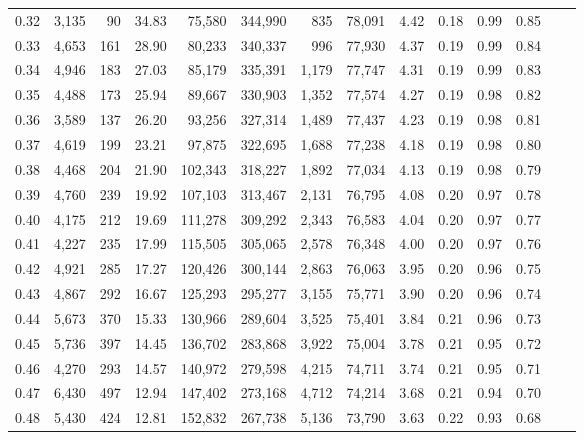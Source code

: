 \begin{tabular}{rrrrrrrrrrrrrr}
0.32 &  3,135 &     90 &    34.83 &   75,580 &  344,990 &     835 &  78,091 &  4.42 &  0.18 &  0.99 &      0.85 \\
0.33 &  4,653 &    161 &    28.90 &   80,233 &  340,337 &     996 &  77,930 &  4.37 &  0.19 &  0.99 &      0.84 \\
0.34 &  4,946 &    183 &    27.03 &   85,179 &  335,391 &   1,179 &  77,747 &  4.31 &  0.19 &  0.99 &      0.83 \\
0.35 &  4,488 &    173 &    25.94 &   89,667 &  330,903 &   1,352 &  77,574 &  4.27 &  0.19 &  0.98 &      0.82 \\
0.36 &  3,589 &    137 &    26.20 &   93,256 &  327,314 &   1,489 &  77,437 &  4.23 &  0.19 &  0.98 &      0.81 \\
0.37 &  4,619 &    199 &    23.21 &   97,875 &  322,695 &   1,688 &  77,238 &  4.18 &  0.19 &  0.98 &      0.80 \\
0.38 &  4,468 &    204 &    21.90 &  102,343 &  318,227 &   1,892 &  77,034 &  4.13 &  0.19 &  0.98 &      0.79 \\
0.39 &  4,760 &    239 &    19.92 &  107,103 &  313,467 &   2,131 &  76,795 &  4.08 &  0.20 &  0.97 &      0.78 \\
0.40 &  4,175 &    212 &    19.69 &  111,278 &  309,292 &   2,343 &  76,583 &  4.04 &  0.20 &  0.97 &      0.77 \\
0.41 &  4,227 &    235 &    17.99 &  115,505 &  305,065 &   2,578 &  76,348 &  4.00 &  0.20 &  0.97 &      0.76 \\
0.42 &  4,921 &    285 &    17.27 &  120,426 &  300,144 &   2,863 &  76,063 &  3.95 &  0.20 &  0.96 &      0.75 \\
0.43 &  4,867 &    292 &    16.67 &  125,293 &  295,277 &   3,155 &  75,771 &  3.90 &  0.20 &  0.96 &      0.74 \\
0.44 &  5,673 &    370 &    15.33 &  130,966 &  289,604 &   3,525 &  75,401 &  3.84 &  0.21 &  0.96 &      0.73 \\
0.45 &  5,736 &    397 &    14.45 &  136,702 &  283,868 &   3,922 &  75,004 &  3.78 &  0.21 &  0.95 &      0.72 \\
0.46 &  4,270 &    293 &    14.57 &  140,972 &  279,598 &   4,215 &  74,711 &  3.74 &  0.21 &  0.95 &      0.71 \\
0.47 &  6,430 &    497 &    12.94 &  147,402 &  273,168 &   4,712 &  74,214 &  3.68 &  0.21 &  0.94 &      0.70 \\
0.48 &  5,430 &    424 &    12.81 &  152,832 &  267,738 &   5,136 &  73,790 &  3.63 &  0.22 &  0.93 &      0.68 \\

\end{tabular}
